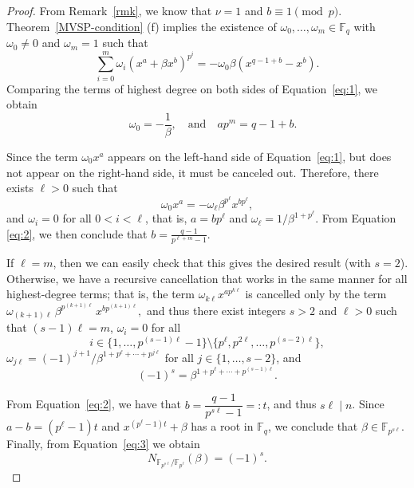 \documentclass[preprint,12pt]{elsarticle}
\begin{document}
\begin{proof}
    From Remark~\ref{rmk}, we know that $\nu = 1$ and $b \equiv 1 \pmod{p}$. Theorem~\ref{MVSP-condition} (f) implies the existence of $\omega_0, \ldots, \omega_m \in \mathbb{F}_q$ with $\omega_0 \neq 0$ and $\omega_m = 1$ such that
    \begin{equation}\label{eq:1}
    \sum_{i=0}^{m} \omega_i (x^a + \beta x^b)^{p^i} = -\omega_0 \beta(x^{q - 1 + b} - x^b).
    \end{equation}
    Comparing the terms of highest  degree on both sides of Equation~\eqref{eq:1}, we obtain
    \begin{equation}\label{eq:2}
    \quad \omega_0 = -\frac{1}{\beta}, \quad \text{and} \quad a p^m = q  - 1 + b.
    \end{equation}

    Since the term $\omega_0 x^a$ appears on the left-hand side of Equation~\eqref{eq:1}, but does not appear on the right-hand side, it must be canceled out. Therefore, there exists $\ell > 0$ such that
    $$\omega_0 x^a = -\omega_{\ell} \beta^{p^{\ell}} x^{bp^{\ell}},$$
    and $\omega_i = 0$ for all $0 < i < \ell$, that is, $a = bp^{\ell}$ and $\omega_{\ell} = 1 / \beta^{1 + p^{\ell}}$. From Equation \eqref{eq:2}, we then conclude that $b = \frac{q - 1}{p^{\ell + m} - 1}$.

    If $\ell = m$, then we can easily check that this gives the desired result (with $s = 2$). Otherwise, we have a recursive cancellation that works in the same manner for all highest-degree terms; that is, the term
$
\omega_{k\ell} x^{a p^{k\ell}}
$
is cancelled only by the term
$
\omega_{(k+1)\ell}\,\beta^{ p^{(k+1)\ell}}\, x^{b p^{(k+1)\ell}},
$
and thus there exist integers $s > 2$ and $\ell > 0$ such that $(s - 1)\ell = m$, $\omega_i = 0$ for all 
    $$i \in \{1, \dots, p^{(s - 1)\ell} - 1\} \setminus \{p^{\ell}, p^{2\ell}, \dots, p^{(s - 2)\ell}\},$$ 
    $\omega_{j\ell} = (-1)^{j + 1} / \beta^{1 + p^\ell + \cdots + p^{j\ell}}$ for all $j \in \{1, \dots, s - 2\}$, and
    \begin{equation}\label{eq:3}
        (-1)^s = \beta^{1 + p^\ell + \cdots + p^{(s - 1)\ell}}.
    \end{equation}

    From Equation~\eqref{eq:2}, we have that $b = \dfrac{q - 1}{p^{s\ell} - 1} =: t$, and thus $s\ell \mid n$. Since $a - b = (p^{\ell} - 1)t$ and $x^{(p^{\ell} - 1)t} + \beta$ has a root in $\mathbb{F}_q$, we conclude that $\beta \in \mathbb{F}_{p^{s\ell}}$. Finally, from Equation~\eqref{eq:3} we obtain
    $$N_{\mathbb{F}_{p^{s\ell}} / \mathbb{F}_{p^{\ell}}}(\beta) = (-1)^s.$$
    

\end{proof}
\end{document}
